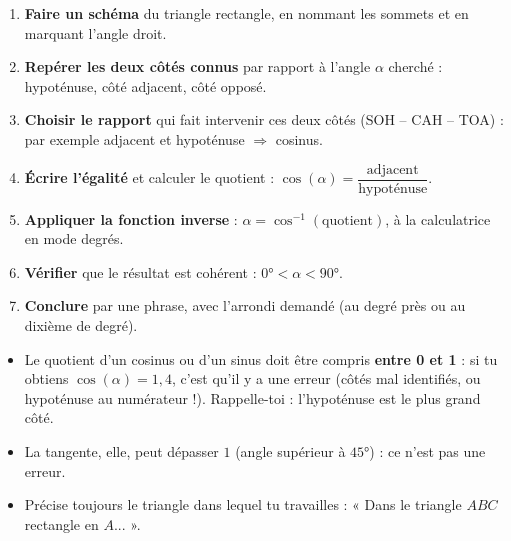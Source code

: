 \documentclass[11pt]{article}
\begin{document}
\begin{methode}
\begin{enumerate}
  \item \textbf{Faire un schéma} du triangle rectangle, en nommant les sommets et en marquant l'angle droit.
  \item \textbf{Repérer les deux côtés connus} par rapport à l'angle $\alpha$ cherché : hypoténuse, côté adjacent, côté opposé.
  \item \textbf{Choisir le rapport} qui fait intervenir ces deux côtés (SOH -- CAH -- TOA) : par exemple adjacent et hypoténuse $\Rightarrow$ cosinus.
  \item \textbf{Écrire l'égalité} et calculer le quotient : $\cos(\alpha) = \dfrac{\text{adjacent}}{\text{hypoténuse}}$.
  \item \textbf{Appliquer la fonction inverse} : $\alpha = \cos^{-1}(\text{quotient})$, à la calculatrice en mode degrés.
  \item \textbf{Vérifier} que le résultat est cohérent : $0° < \alpha < 90°$.
  \item \textbf{Conclure} par une phrase, avec l'arrondi demandé (au degré près ou au dixième de degré).
\end{enumerate}
\end{methode}

\begin{attention}
\begin{itemize}
  \item Le quotient d'un cosinus ou d'un sinus doit être compris \textbf{entre 0 et 1} : si tu obtiens $\cos(\alpha) = 1,4$, c'est qu'il y a une erreur (côtés mal identifiés, ou hypoténuse au numérateur !). Rappelle-toi : l'hypoténuse est le plus grand côté.
  \item La tangente, elle, peut dépasser $1$ (angle supérieur à $45°$) : ce n'est pas une erreur.
  \item Précise toujours le triangle dans lequel tu travailles : « Dans le triangle $ABC$ rectangle en $A$... ».
\end{itemize}
\end{attention}
\end{document}
